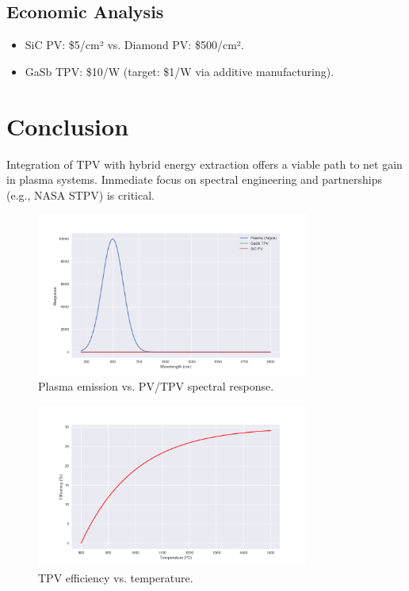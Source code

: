 \documentclass{article}
\begin{document}
\subsection{Economic Analysis}
\begin{itemize}
    \item SiC PV: \$5/cm² vs. Diamond PV: \$500/cm².
    \item GaSb TPV: \$10/W (target: \$1/W via additive manufacturing).
\end{itemize}

\section{Conclusion}
\label{sec:conclusion}
Integration of TPV with hybrid energy extraction offers a viable path to net gain in plasma systems. Immediate focus on spectral engineering and partnerships (e.g., NASA STPV) is critical.

\begin{figure}[ht]
    \centering
    \includegraphics[width=0.8\textwidth]{spectra.png}
    \caption{Plasma emission vs. PV/TPV spectral response.}
    \label{fig:spectra}
\end{figure}

\begin{figure}[ht]
    \centering
    \includegraphics[width=0.8\textwidth]{efficiency.png}
    \caption{TPV efficiency vs. temperature.}
    \label{fig:efficiency}
\end{figure}



\end{document}
